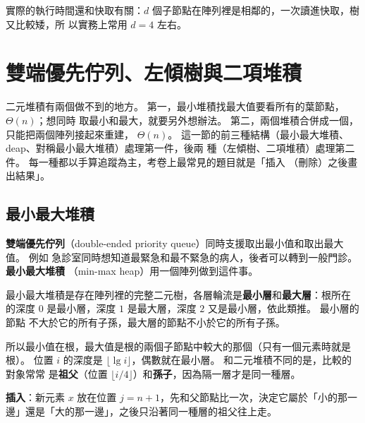 實際的執行時間還和快取有關：$d$ 個子節點在陣列裡是相鄰的，一次讀進快取，樹又比較矮，所
以實務上常用 $d = 4$ 左右。

\section{雙端優先佇列、左傾樹與二項堆積}
\label{sec:hp-mergeable}

二元堆積有兩個做不到的地方。 第一，最小堆積找最大值要看所有的葉節點，$\Theta(n)$；想同時
取最小和最大，就要另外想辦法。 第二，兩個堆積合併成一個，只能把兩個陣列接起來重建，
$\Theta(n)$。 這一節的前三種結構（最小最大堆積、deap、對稱最小最大堆積）處理第一件，後兩
種（左傾樹、二項堆積）處理第二件。 每一種都以手算追蹤為主，考卷上最常見的題目就是「插入
（刪除）之後畫出結果」。

\subsection{最小最大堆積}

\textbf{雙端優先佇列}（double-ended priority queue）同時支援取出最小值和取出最大值。 例如
急診室同時想知道最緊急和最不緊急的病人，後者可以轉到一般門診。 \textbf{最小最大堆積}
（min-max heap）用一個陣列做到這件事。

\begin{definition}[最小最大堆積]
\label{def:hp-minmax}
最小最大堆積是存在陣列裡的完整二元樹，各層輪流是\textbf{最小層}和\textbf{最大層}：根所在
的深度 $0$ 是最小層，深度 $1$ 是最大層，深度 $2$ 又是最小層，依此類推。 最小層的節點
不大於它的所有子孫，最大層的節點不小於它的所有子孫。
\end{definition}

所以最小值在根，最大值是根的兩個子節點中較大的那個（只有一個元素時就是根）。 位置 $i$
的深度是 $\lfloor \lg i \rfloor$，偶數就在最小層。 和二元堆積不同的是，比較的對象常常
是\textbf{祖父}（位置 $\lfloor i/4 \rfloor$）和\textbf{孫子}，因為隔一層才是同一種層。

\textbf{插入}：新元素 $x$ 放在位置 $j = n + 1$，先和父節點比一次，決定它屬於「小的那一
邊」還是「大的那一邊」，之後只沿著同一種層的祖父往上走。

